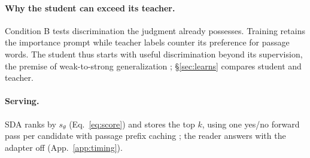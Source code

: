 \paragraph{Why the student can exceed its teacher.}
Condition B tests discrimination the judgment already possesses. Training retains the importance prompt while teacher labels counter its preference for passage words. The student thus starts with useful discrimination beyond its supervision, the premise of weak-to-strong generalization \citep{burns2023weak}; \S\ref{sec:learns} compares student and teacher.

\paragraph{Serving.}
SDA ranks by $s_\theta$ (Eq.~\eqref{eq:score}) and stores the top $k$, using one yes/no forward pass per candidate with passage prefix caching \citep{kwon2023pagedattention}; the reader answers with the adapter off (App.~\ref{app:timing}).
